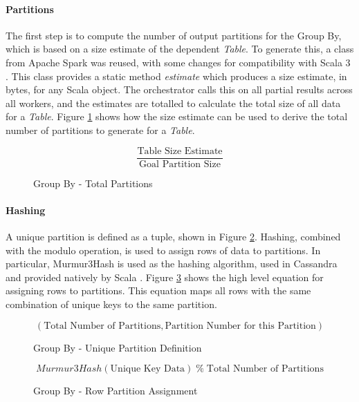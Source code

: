 \paragraph{Partitions}
The first step is to compute the number of output partitions for the Group By, which is based on a size estimate of the dependent \textit{Table}. To generate this, a class from Apache Spark was reused, with some changes for compatibility with Scala 3 \cite{zaharia2016spark}. This class provides a static method \textit{estimate} which produces a size estimate, in bytes, for any Scala object. The orchestrator calls this on all partial results across all workers, and the estimates are totalled to calculate the total size of all data for a \textit{Table}. Figure \ref{fig:group-by-num-partitions} shows how the size estimate can be used to derive the total number of partitions to generate for a \textit{Table}.

\begin{figure}[h]
	\centering
	\[ \frac{\text{Table Size Estimate}}{\text{Goal Partition Size}} \]
	\caption{Group By - Total Partitions}
	\label{fig:group-by-num-partitions}
\end{figure}



\paragraph{Hashing} 
A unique partition is defined as a tuple, shown in Figure \ref{fig:group-by-unique-partition}. Hashing, combined with the modulo operation, is used to assign rows of data to partitions. In particular, Murmur3Hash is used as the hashing algorithm, used in Cassandra and provided natively by Scala \cite{murmur3hash}. Figure \ref{fig:group-by-partition-assign} shows the high level equation for assigning rows to partitions. This equation maps all rows with the same combination of unique keys to the same partition.

\begin{figure}[h]
	\centering
	\[ (\text{Total Number of Partitions}, \text{Partition Number for this Partition}) \]
	\caption{Group By - Unique Partition Definition}
	\label{fig:group-by-unique-partition}
\end{figure} 

\begin{figure}[h]
	\centering
	\[ Murmur3Hash(\text{Unique Key Data}) \; \%  \; \text{Total Number of Partitions} \]
	\caption{Group By - Row Partition Assignment}
	\label{fig:group-by-partition-assign}
\end{figure} 

